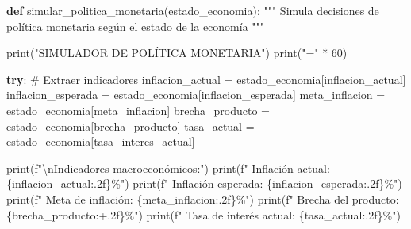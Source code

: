 \documentclass[
  doc,
  floatsintext,
  longtable,
  a4paper,
  nolmodern,
  notxfonts,
  notimes,
  12pt,
  colorlinks=true,linkcolor=blue,citecolor=blue,urlcolor=blue]{apa7}
\newenvironment{Shaded}{\begin{snugshade}}{\end{snugshade}}
\newcommand{\BuiltInTok}[1]{\textcolor[rgb]{0.00,0.23,0.31}{#1}}
\newcommand{\CharTok}[1]{\textcolor[rgb]{0.13,0.47,0.30}{#1}}
\newcommand{\CommentTok}[1]{\textcolor[rgb]{0.37,0.37,0.37}{#1}}
\newcommand{\ControlFlowTok}[1]{\textcolor[rgb]{0.00,0.23,0.31}{\textbf{#1}}}
\newcommand{\DecValTok}[1]{\textcolor[rgb]{0.68,0.00,0.00}{#1}}
\newcommand{\KeywordTok}[1]{\textcolor[rgb]{0.00,0.23,0.31}{\textbf{#1}}}
\newcommand{\NormalTok}[1]{\textcolor[rgb]{0.00,0.23,0.31}{#1}}
\newcommand{\OperatorTok}[1]{\textcolor[rgb]{0.37,0.37,0.37}{#1}}
\newcommand{\SpecialCharTok}[1]{\textcolor[rgb]{0.37,0.37,0.37}{#1}}
\newcommand{\SpecialStringTok}[1]{\textcolor[rgb]{0.13,0.47,0.30}{#1}}
\newcommand{\StringTok}[1]{\textcolor[rgb]{0.13,0.47,0.30}{#1}}
\begin{document}
\begin{Shaded}
\begin{Highlighting}[]
\KeywordTok{def}\NormalTok{ simular\_politica\_monetaria(estado\_economia):}
    \CommentTok{"""}
\CommentTok{    Simula decisiones de política monetaria según el estado de la economía}
\CommentTok{    """}
    
    \BuiltInTok{print}\NormalTok{(}\StringTok{"SIMULADOR DE POLÍTICA MONETARIA"}\NormalTok{)}
    \BuiltInTok{print}\NormalTok{(}\StringTok{"="} \OperatorTok{*} \DecValTok{60}\NormalTok{)}
    
    \ControlFlowTok{try}\NormalTok{:}
        \CommentTok{\# Extraer indicadores}
\NormalTok{        inflacion\_actual }\OperatorTok{=}\NormalTok{ estado\_economia[}\StringTok{\textquotesingle{}inflacion\_actual\textquotesingle{}}\NormalTok{]}
\NormalTok{        inflacion\_esperada }\OperatorTok{=}\NormalTok{ estado\_economia[}\StringTok{\textquotesingle{}inflacion\_esperada\textquotesingle{}}\NormalTok{]}
\NormalTok{        meta\_inflacion }\OperatorTok{=}\NormalTok{ estado\_economia[}\StringTok{\textquotesingle{}meta\_inflacion\textquotesingle{}}\NormalTok{]}
\NormalTok{        brecha\_producto }\OperatorTok{=}\NormalTok{ estado\_economia[}\StringTok{\textquotesingle{}brecha\_producto\textquotesingle{}}\NormalTok{]}
\NormalTok{        tasa\_actual }\OperatorTok{=}\NormalTok{ estado\_economia[}\StringTok{\textquotesingle{}tasa\_interes\_actual\textquotesingle{}}\NormalTok{]}
        
        \BuiltInTok{print}\NormalTok{(}\SpecialStringTok{f"}\CharTok{\textbackslash{}n}\SpecialStringTok{Indicadores macroeconómicos:"}\NormalTok{)}
        \BuiltInTok{print}\NormalTok{(}\SpecialStringTok{f"  Inflación actual: }\SpecialCharTok{\{}\NormalTok{inflacion\_actual}\SpecialCharTok{:.2f\}}\SpecialStringTok{\%"}\NormalTok{)}
        \BuiltInTok{print}\NormalTok{(}\SpecialStringTok{f"  Inflación esperada: }\SpecialCharTok{\{}\NormalTok{inflacion\_esperada}\SpecialCharTok{:.2f\}}\SpecialStringTok{\%"}\NormalTok{)}
        \BuiltInTok{print}\NormalTok{(}\SpecialStringTok{f"  Meta de inflación: }\SpecialCharTok{\{}\NormalTok{meta\_inflacion}\SpecialCharTok{:.2f\}}\SpecialStringTok{\%"}\NormalTok{)}
        \BuiltInTok{print}\NormalTok{(}\SpecialStringTok{f"  Brecha del producto: }\SpecialCharTok{\{}\NormalTok{brecha\_producto}\SpecialCharTok{:+.2f\}}\SpecialStringTok{\%"}\NormalTok{)}
        \BuiltInTok{print}\NormalTok{(}\SpecialStringTok{f"  Tasa de interés actual: }\SpecialCharTok{\{}\NormalTok{tasa\_actual}\SpecialCharTok{:.2f\}}\SpecialStringTok{\%"}\NormalTok{)}
        

\end{Highlighting}
\end{Shaded}
\end{document}
